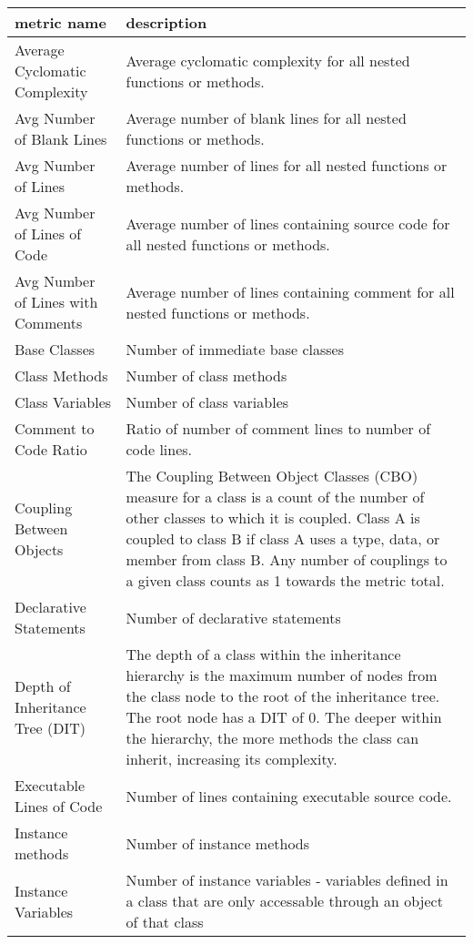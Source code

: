 \begin{apendicesenv}
    \begin{center}
    \footnotesize
    \begin{longtabu} to 
    \toprule
    \textbf{metric name} & \textbf{description} \\ 
    \midrule
    \endhead
    Average Cyclomatic Complexity & Average cyclomatic complexity for all nested functions or methods. \\
    Avg Number of Blank Lines & Average number of blank lines for all nested functions or methods. \\
    Avg Number of Lines & Average number of lines for all nested functions or methods. \\
    Avg Number of Lines of Code & Average number of lines containing source code for all nested functions or methods. \\
    Avg Number of Lines with Comments & Average number of lines containing comment for all nested functions or methods. \\
    Base Classes & Number of immediate base classes \\
    Class Methods & Number of class methods \\
    Class Variables & Number of class variables \\
    Comment to Code Ratio & Ratio of number of comment lines to number of code lines. \\
    Coupling Between Objects & The Coupling Between Object Classes (CBO) measure for a class is a count of the number of other classes to which it is coupled. Class A is coupled to class B if class A uses a type, data, or member from class B. Any number of couplings to a given class counts as 1 towards the metric total. \\
    Declarative Statements & Number of declarative statements \\
    Depth of Inheritance Tree (DIT) & The depth of a class within the inheritance hierarchy is the maximum number of nodes from the class node to the root of the inheritance tree. The root node has a DIT of 0. The deeper within the hierarchy, the more methods the class can inherit, increasing its complexity. \\
    Executable Lines of Code & Number of lines containing executable source code. \\
    Instance methods & Number of instance methods \\
    Instance Variables & Number of instance variables - variables defined in a class that are only accessable through an object of that class \\

\end{longtabu}
\end{center}
\end{apendicesenv}
